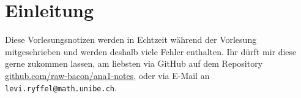 \documentclass[../main.tex]{subfiles}
\begin{document}
\chapter*{Einleitung}
Diese Vorlesungsnotizen werden in Echtzeit während der Vorlesung mitgeschrieben
und werden deshalb viele Fehler enthalten.
Ihr dürft mir diese gerne zukommen lassen, am liebsten via GitHub
auf dem Repository
\href{https://github.com/raw-bacon/ana1-notes}{github.com/raw-bacon/ana1-notes},
oder via E-Mail an \texttt{levi.ryffel@math.unibe.ch}.
\end{document}
